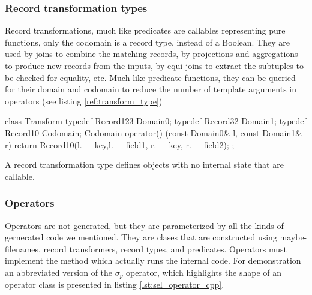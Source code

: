 \subsubsection{Record transformation types}

Record transformations, much like predicates are callables
representing pure functions, only the codomain is a record type,
instead of a Boolean. They are used by joins to combine the matching
records, by projections and aggregations to produce new records from
the inputs, by equi-joins to extract the subtuples to be checked for
equality, etc. Much like predicate functions, they can be queried for their
domain and codomain to reduce the number of template arguments in
operators (see listing \ref{ref:transform_type})

\begin{code}
\begin{cppcode}
class Transform {
  typedef Record123 Domain0;
  typedef Record32 Domain1;
  typedef Record10 Codomain;
  Codomain operator() (const Domain0& l, const Domain1& r) {
    return Record10(l.__key,l.__field1, r.__key, r.__field2);
  }
};
\end{cppcode}
  \caption{\label{ref:transform_type}A record transformation type
    defines objects with no internal state that are callable.}
\end{code}


\subsubsection{Operators}

Operators are not generated, but they are parameterized by all the
kinds of gernerated code we mentioned. They are clases that are
constructed using maybe-filenames, record transformers, record types,
and predicates. Operators must implement the  method which actually
runs the internal code. For demonstration an abbreviated
version of the \(\sigma_p\) operator, which highlights the shape of an
operator class is presented in listing \ref{lst:sel_operator_cpp}.

